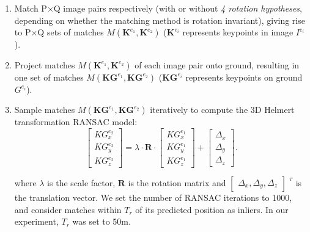 \begin{enumerate}
    \item Match P$\times$Q image pairs respectively (with or without \textit{4 rotation hypotheses}, depending on whether the matching method is rotation invariant), giving rise to P$\times$Q sets of matches $M({\mathbf{K}^{e_1},\mathbf{K}^{e_2}})$ ($\mathbf{K}^{e_i}$ represents keypoints in image $I^{e_i}$).
    \item Project matches $M({\mathbf{K}^{e_1},\mathbf{K}^{e_2}})$ of each image pair onto ground, resulting in one set of matches $M({\mathbf{KG}^{e_1},\mathbf{KG}^{e_2}})$ ($\mathbf{KG}^{e_i}$ represents keypoints on ground $G^{e_i}$).
    \item Sample matches $M({\mathbf{KG}^{e_1},\mathbf{KG}^{e_2}})$ iteratively to compute the 3D Helmert transformation RANSAC model:
\begin{equation}
\left [ \begin{array}{c}
{KG}_x^{e_2}\\
{KG}_y^{e_2}\\
{KG}_z^{e_2}
\end{array}
\right ] =\lambda \cdot \mathbf{R} \cdot {\left [ \begin{array}{c}
    {KG}_x^{e_1}\\
    {KG}_y^{e_1}\\
    {KG}_z^{e_1}
    \end{array}
    \right ]} + \left [ \begin{array}{c}
\Delta_x\\
\Delta_y\\
\Delta_z
\end{array}
\right ]. \label{eq:2DSim}
\end{equation}
    
where $\lambda$ is the scale factor, $\mathbf{R}$ is the rotation matrix and $\left [ \begin{array}{c}
    \Delta_x, \Delta_y, \Delta_z
\end{array}
\right ]$ $^{^T}$ is the translation vector.
We set the number of RANSAC iterations to 1000, and consider matches within $T_r$ of its predicted position as inliers. In our experiment, {$T_r$ was set to 50m.}
\end{enumerate}

